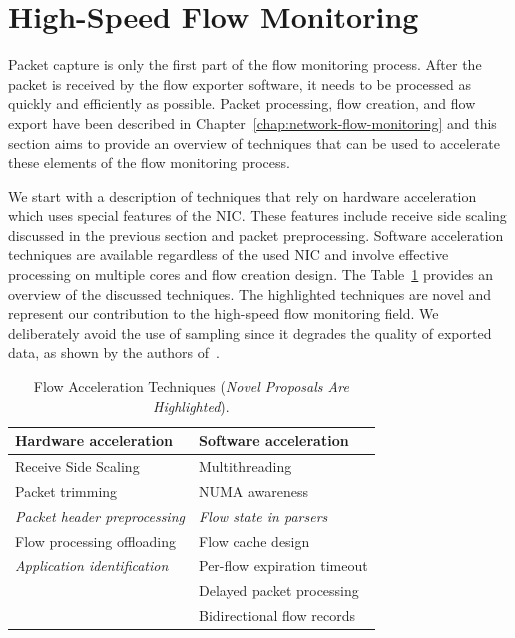 \section{High-Speed Flow Monitoring}

Packet capture is only the first part of the flow monitoring process. After the packet is received by the flow exporter software, it needs to be processed as quickly and efficiently as possible. Packet processing, flow creation, and flow export have been described in Chapter~\ref{chap:network-flow-monitoring} and this section aims to provide an overview of techniques that can be used to accelerate these elements of the flow monitoring process. 

We start with a description of techniques that rely on hardware acceleration which uses special features of the NIC. These features include receive side scaling discussed in the previous section and packet preprocessing. Software acceleration techniques are available regardless of the used NIC and involve effective processing on multiple cores and flow creation design. The Table~\ref{tab:flow-acc-techniques} provides an overview of the discussed techniques. The highlighted techniques are novel and represent our contribution to the high-speed flow monitoring field. We deliberately avoid the use of sampling since it degrades the quality of exported data, as shown by the authors of~\cite{Brauckhoff-2006-Impact}.

\begin{table}[ht!]
    \centering
    \begin{tabular}{l|l}
    \toprule
    \textbf{Hardware acceleration} & \textbf{Software acceleration} \\ \hline
    Receive Side Scaling & Multithreading \\
    Packet trimming & NUMA awareness \\
    \emph{Packet header preprocessing} & \emph{Flow state in parsers} \\
    Flow processing offloading & Flow cache design \\
    \emph{Application identification} & Per-flow expiration timeout \\ 
    & Delayed packet processing \\ 
    & Bidirectional flow records \\ \bottomrule
    \end{tabular}
    \caption{Flow Acceleration Techniques (\emph{Novel Proposals Are Highlighted}).}
    \label{tab:flow-acc-techniques}
\end{table}

